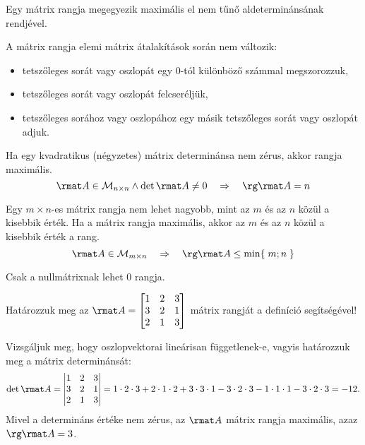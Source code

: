 \documentclass[a4paper, 12pt]{scrartcl}
\begin{document}
\begin{theorem}
  Egy mátrix rangja megegyezik maximális el nem tűnő aldeterminánsának
  rendjével.
\end{theorem}

\begin{note}
  A mátrix rangja elemi mátrix átalakítások során nem változik:
  \begin{itemize}
    \item tetszőleges sorát vagy oszlopát egy 0-tól különböző számmal
          megszorozzuk,
    \item tetszőleges sorát vagy oszlopát felcseréljük,
    \item tetszőleges sorához vagy oszlopához egy másik tetszőleges sorát vagy
          oszlopát adjuk.
  \end{itemize}
\end{note}

\begin{note}
  Ha egy kvadratikus (négyzetes) mátrix determinánsa nem zérus, akkor rangja
  maximális.
  $$
    \rmat A \in \mathcal M_{n \times n}
    \land
    \det \rmat A \neq 0
    \quad \Rightarrow \quad
    \rg \rmat A = n
  $$
\end{note}

\begin{note}
  Egy $m \times n$-es mátrix rangja nem lehet nagyobb, mint az $m$ és az $n$
  közül a kisebbik érték. Ha a mátrix rangja maximális, akkor az $m$ és az $n$
  közül a kisebbik érték a rang.
  $$
    \rmat A \in \mathcal M_{m \times n}
    \quad \Rightarrow \quad
    \rg \rmat A \leq \min\{\; m; n \;\}
  $$
\end{note}

\begin{note}
  Csak a nullmátrixnak lehet 0 rangja.
\end{note}

\begin{example}
  Határozzuk meg az $\rmat A = \begin{bmatrix}
      1 & 2 & 3 \\
      3 & 2 & 1 \\
      2 & 1 & 3
    \end{bmatrix}$ mátrix rangját a definíció segítségével!

  Vizsgáljuk meg, hogy oszlopvektorai lineárisan függetlenek-e, vagyis
  határozzuk meg a mátrix determinánsát:
  $$
    \det \rmat A = \begin{vmatrix}
      1 & 2 & 3 \\
      3 & 2 & 1 \\
      2 & 1 & 3
    \end{vmatrix}
    = 1 \cdot 2 \cdot 3
    + 2 \cdot 1 \cdot 2
    + 3 \cdot 3 \cdot 1
    - 3 \cdot 2 \cdot 3
    - 1 \cdot 1 \cdot 1
    - 3 \cdot 2 \cdot 3
    = -12
    \text.
  $$
  Mivel a determináns értéke nem zérus, az $\rmat A$ mátrix rangja maximális,
  azaz $\rg \rmat A = 3$.
\end{example}
\end{document}

